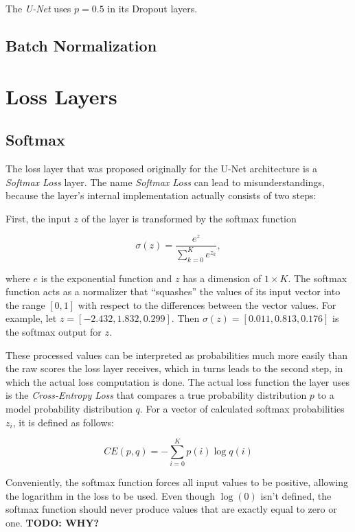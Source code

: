 The \textit{U-Net} uses $p = 0.5$ in its Dropout layers.



		\subsection {Batch Normalization}




	\section {Loss Layers}

		\subsection{Softmax}

The loss layer that was proposed originally for the U-Net architecture is a \textit{Softmax Loss} layer. The name \textit{Softmax Loss} can lead to misunderstandings, because the layer's internal implementation actually consists of two steps:

First, the input $z$ of the layer is transformed by the softmax function

\[\sigma(z) = \frac{e^{z}}{\sum \limits_{k=0}^{K} e^{z_k}},\]

\noindent where $e$ is the exponential function and $z$ has a dimension of $1 \times K$. The softmax function acts as a normalizer that ``squashes'' the values of its input vector into the range $[0, 1]$ with respect to the differences between the vector values. For example, let $z = [-2.432, 1.832, 0.299]$. Then $\sigma(z) = [0.011, 0.813, 0.176]$ is the softmax output for $z$.

These processed values can be interpreted as probabilities much more easily than the raw scores the loss layer receives, which in turns leads to the second step, in which the actual loss computation is done. The actual loss function the layer uses is the \textit{Cross-Entropy Loss} that compares a true probability distribution $p$ to a model probability distribution $q$. For a vector of calculated softmax probabilities $z_i$, it is defined as follows:

\[CE(p, q) = -\sum \limits_{i = 0}^{K} p(i) \log q(i)\]

\noindent Conveniently, the softmax function forces all input values to be positive, allowing the logarithm in the loss to be used. Even though $\log (0)$ isn't defined, the softmax function should never produce values that are exactly equal to zero or one. \textbf{TODO: WHY?} 

